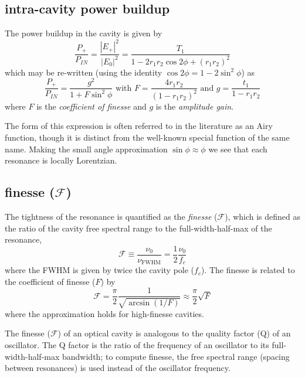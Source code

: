 \subsection{intra-cavity power buildup}

The power buildup in the cavity is given by 
\begin{equation}
\frac{P_+}{P_{IN}} = \frac{|E_+|^2}{|E_0|^2} = \frac{ T_1}{1 - 2 r_1 r_2 \cos 2\phi+\left(r_1 r_2\right)^2 }
\end{equation} 
which may be re-written (using the identity $\cos2\phi = 1 -
2\sin^2\phi$) as
\begin{equation}
\label{cavity_buildup_eq}
\frac{P_+}{P_{IN}} = \frac{g^2}{1 + F \sin^2 \phi} 
\text{  with  } F = \frac{4 r_1 r_2}{(1 - r_1 r_2)^2}
\text{  and  } g = \frac{t_1}{1-r_1 r_2}
\end{equation} 
where $F$ is the \emph{coefficient of finesse} and $g$ is the
\emph{amplitude gain}.

The form of this expression is often referred to in the literature as
an Airy function, though it is distinct from the well-known special
function of the same name.  Making the small angle approximation
$\sin\phi\approx\phi$ we see that each resonance is locally Lorentzian.

\subsection{finesse ($\mathcal{F}$)}
The tightness of the resonance is quantified as the
\emph{finesse} ($\mathcal{F}$), which is defined as the ratio of the
cavity free spectral range to the full-width-half-max of the
resonance,
\begin{equation}
\mathcal{F} \equiv \frac{\nu_0}{\nu_{\mathrm{FWHM}}}
= \frac{1}{2}\frac{\nu_0}{f_c}
\end{equation}
%
where the FWHM is given by twice the cavity pole ($f_c$).  The finesse is related to the coefficient of finesse ($F$) by
%
\begin{equation}
\mathcal{F} = \frac{\pi}{2} \frac{1}{{\sqrt{\arcsin (1/F)}}} \approx \frac{\pi}{2}\sqrt{F}
\end{equation}where the approximation holds for high-finesse cavities.

The finesse ($\mathcal{F}$) of an optical cavity is analogous to
the quality factor (Q) of an oscillator. The Q factor is the ratio
of the frequency of an oscillator to its full-width-half-max bandwidth;
to compute finesse, the free spectral range (spacing between resonances)
is used instead of the oscillator frequency.



